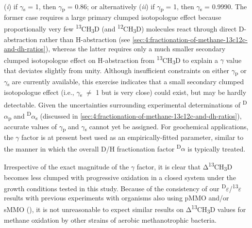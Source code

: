 (\emph{i}) if $\gamma$\textsubscript{s} = 1, then $\gamma$\textsubscript{p} = 0.86; or
alternatively (\emph{ii}) if $\gamma$\textsubscript{p} = 1, then
$\gamma$\textsubscript{s} = 0.9990. The former case requires a large primary
clumped isotopologue effect because proportionally very few
\textsuperscript{13}CH\textsubscript{3}D (and
\textsuperscript{12}CH\textsubscript{3}D) molecules react through direct
D-abstraction rather than H-abstraction (see \autoref{sec:4:fractionation-of-methane-13c12c-and-dh-ratios}), whereas the
latter requires only a much smaller secondary clumped isotopologue
effect on H-abstraction from \textsuperscript{13}CH\textsubscript{3}D to
explain a $\gamma$ value that deviates slightly from unity. Although
insufficient constraints on either $\gamma$\textsubscript{p} or
$\gamma$\textsubscript{s} are currently available, this exercise indicates that
a small secondary clumped isotopologue effect (i.e., $\gamma$\textsubscript{s}
$\neq$ 1 but is very close) could exist, but may be hardly detectable. Given
the uncertainties surrounding experimental determinations of
\textsuperscript{D}$\alpha$\textsubscript{p} and
\textsuperscript{D}$\alpha$\textsubscript{s} (discussed in \autoref{sec:4:fractionation-of-methane-13c12c-and-dh-ratios}),
accurate values of $\gamma$\textsubscript{p} and $\gamma$\textsubscript{s} cannot yet
be assigned. For geochemical applications, the $\gamma$ factor is at present
best used as an empirically-fitted parameter, similar to the manner in
which the overall D/H fractionation factor \textsuperscript{D}$\alpha$ is
typically treated.

Irrespective of the exact magnitude of the $\gamma$ factor, it is clear that
Δ\textsuperscript{13}CH\textsubscript{3}D becomes less clumped with
progressive oxidation in a closed system under the growth conditions
tested in this study. Because of the consistency of our
\textsuperscript{D}$\varepsilon$/\textsuperscript{13}$\varepsilon$ results with previous
experiments with organisms also using pMMO and/or sMMO (), it is
not unreasonable to expect similar results on
Δ\textsuperscript{13}CH\textsubscript{3}D values for methane oxidation
by other strains of aerobic methanotrophic bacteria.

